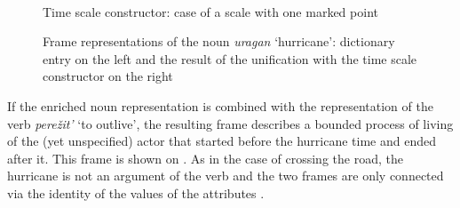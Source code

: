 \begin{figure}
\begin{minipage}{0.65\textwidth}
\\
\end{minipage}%
\begin{minipage}{0.35\textwidth}
\end{minipage}
\caption{Time scale constructor: case of a scale with one marked point \label{constructor:time}}
\end{figure}

\begin{figure}
\hfill%
\hfill%
\caption{Frame representations of the noun \textit{uragan} `hurricane': dictionary entry on the left and the result of the unification with the time scale constructor on the right \label{frame:hurricane}}
\end{figure}

If the enriched noun representation is combined with the representation of the verb \textit{pere\v{z}it'} `to outlive', the resulting frame describes a bounded process of living of the (yet unspecified) actor that started before the hurricane time and ended after it. This frame is shown on . As in the case of crossing the road, the hurricane is not an argument of the verb and the two frames are only connected via the identity of the values of the attributes \NOUNDIM.

